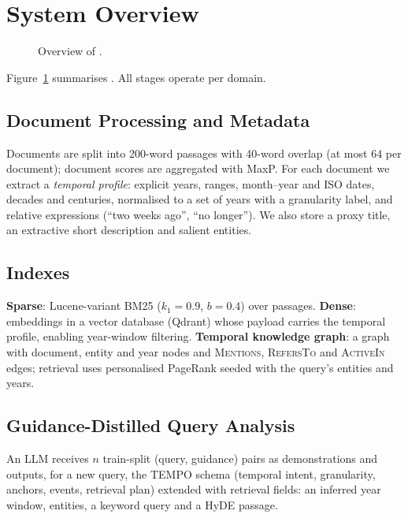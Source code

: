 \section{System Overview}
\label{sec:system}

\begin{figure}[t]
  \centering
  \caption{Overview of \sys.}
  \label{fig:overview}
\end{figure}

Figure~\ref{fig:overview} summarises \sys. All stages operate per domain.

\subsection{Document Processing and Metadata}
\label{sec:metadata}
Documents are split into 200-word passages with 40-word overlap (at most 64 per document);
document scores are aggregated with MaxP. For each document we extract a \emph{temporal profile}:
explicit years, ranges, month--year and ISO dates, decades and centuries, normalised to a set of
years with a granularity label, and relative expressions (``two weeks ago'', ``no longer''). We
also store a proxy title, an extractive short description and salient entities.

\subsection{Indexes}
\textbf{Sparse}: Lucene-variant BM25 ($k_1{=}0.9$, $b{=}0.4$) over passages.
\textbf{Dense}:  embeddings in a vector database (Qdrant) whose payload carries the
temporal profile, enabling year-window filtering.
\textbf{Temporal knowledge graph}: a graph with document, entity and year nodes and
\textsc{Mentions}, \textsc{RefersTo} and \textsc{ActiveIn} edges; retrieval uses personalised
PageRank seeded with the query's entities and years.

\subsection{Guidance-Distilled Query Analysis}
\label{sec:query}
An LLM receives $n$ train-split (query, guidance) pairs as demonstrations and outputs, for a new
query, the TEMPO schema (temporal intent, granularity, anchors, events, retrieval plan) extended
with retrieval fields: an inferred year window, entities, a keyword query and a HyDE passage.

